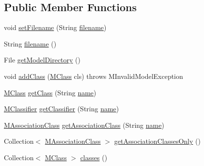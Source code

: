 \subsection*{Public Member Functions}
\begin{DoxyCompactItemize}
\item 
void \hyperlink{classorg_1_1tzi_1_1use_1_1uml_1_1mm_1_1_m_model_a1c6a8cd5cf6057ca2086bf7d1e9faf56}{set\-Filename} (String \hyperlink{classorg_1_1tzi_1_1use_1_1uml_1_1mm_1_1_m_model_a69f8bf0f1fc087aee3851a7a6c15ff85}{filename})
\item 
String \hyperlink{classorg_1_1tzi_1_1use_1_1uml_1_1mm_1_1_m_model_a69f8bf0f1fc087aee3851a7a6c15ff85}{filename} ()
\item 
File \hyperlink{classorg_1_1tzi_1_1use_1_1uml_1_1mm_1_1_m_model_a6f86f507f1bdb89eb81c4c45fd959fd1}{get\-Model\-Directory} ()
\item 
void \hyperlink{classorg_1_1tzi_1_1use_1_1uml_1_1mm_1_1_m_model_a05b472878e401c746dfd5258f4491eb1}{add\-Class} (\hyperlink{interfaceorg_1_1tzi_1_1use_1_1uml_1_1mm_1_1_m_class}{M\-Class} cls)  throws M\-Invalid\-Model\-Exception 
\item 
\hyperlink{interfaceorg_1_1tzi_1_1use_1_1uml_1_1mm_1_1_m_class}{M\-Class} \hyperlink{classorg_1_1tzi_1_1use_1_1uml_1_1mm_1_1_m_model_ad755b353320e7b5d321e1f6c88c7cae1}{get\-Class} (String \hyperlink{classorg_1_1tzi_1_1use_1_1uml_1_1mm_1_1_m_model_element_impl_ac9997b04c10d247c21c22d431d99400d}{name})
\item 
\hyperlink{interfaceorg_1_1tzi_1_1use_1_1uml_1_1mm_1_1_m_classifier}{M\-Classifier} \hyperlink{classorg_1_1tzi_1_1use_1_1uml_1_1mm_1_1_m_model_a0ebb14247401c3693b7ab75d440b6b1c}{get\-Classifier} (String \hyperlink{classorg_1_1tzi_1_1use_1_1uml_1_1mm_1_1_m_model_element_impl_ac9997b04c10d247c21c22d431d99400d}{name})
\item 
\hyperlink{interfaceorg_1_1tzi_1_1use_1_1uml_1_1mm_1_1_m_association_class}{M\-Association\-Class} \hyperlink{classorg_1_1tzi_1_1use_1_1uml_1_1mm_1_1_m_model_a6ba1984c016814d7a0386b04dd968aff}{get\-Association\-Class} (String \hyperlink{classorg_1_1tzi_1_1use_1_1uml_1_1mm_1_1_m_model_element_impl_ac9997b04c10d247c21c22d431d99400d}{name})
\item 
Collection$<$ \hyperlink{interfaceorg_1_1tzi_1_1use_1_1uml_1_1mm_1_1_m_association_class}{M\-Association\-Class} $>$ \hyperlink{classorg_1_1tzi_1_1use_1_1uml_1_1mm_1_1_m_model_a0f53bcccb381a75905320ffb40783747}{get\-Association\-Classes\-Only} ()
\item 
Collection$<$ \hyperlink{interfaceorg_1_1tzi_1_1use_1_1uml_1_1mm_1_1_m_class}{M\-Class} $>$ \hyperlink{classorg_1_1tzi_1_1use_1_1uml_1_1mm_1_1_m_model_a69fe11e7513a709807c99da655f2e2ee}{classes} ()

\end{DoxyCompactItemize}
